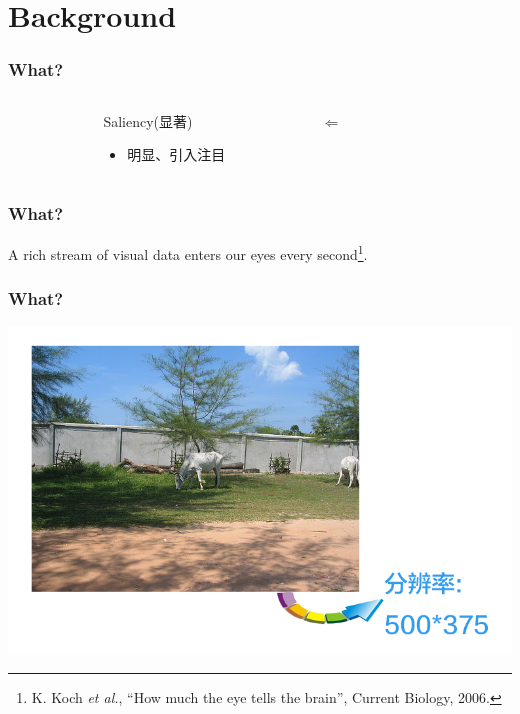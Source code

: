 \documentclass[notheorems,serif,table,compress]{beamer}  %
\begin{document}
\section{Background}



\begin{frame}[fragile]
\frametitle{What?}
\begin{columns}
\begin{column}{\leftmargini}
\end{column}
\begin{column}{0.5\linewidth}
\huge{Saliency(显著)}

\begin{itemize}
\item \large{明显、引入注目}
\end{itemize}
\end{column}
\pause
\begin{column}{0.16\linewidth}
\huge $\Longleftarrow$ 
\end{column}
\pause
\begin{column}{0.3\linewidth}
 \centering{\huge \color{blue}{Visual Attention}}
\end{column}
\end{columns}\vspace{1ex}
\end{frame}


\begin{frame}
\frametitle{What?}
  A rich stream of visual data enters our eyes every second\footnote{K. Koch \textit{et al.}, ``How much the eye tells the brain'', Current Biology, 2006. }.\newline
  
  \pause
  \centering{\Huge \color{blue}{$10^8 \sim 10^9 bits$}}
\end{frame}
  
  
\begin{frame}
  \frametitle{What?}
  \begin{center}
  \includegraphics[width=0.85\linewidth]{tuxiang.png}
  \end{center}
  
  \pause
\end{frame}
\end{document}
